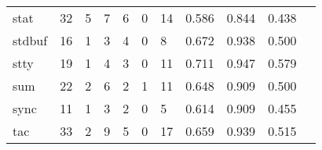 \begin{longtable}{lp{1.20cm}p{1.20cm}p{1.20cm}p{1.20cm}p{1.20cm}p{1.20cm}p{1.20cm}p{1.20cm}p{1.20cm}p{1.20cm}}
stat      &                                    32 &                                                  5 &                                                  7 &                                                  6 &                                                  0 &                                                 14 &                                         0.586 &                                              0.844 &                                              0.438 \\
stdbuf    &                                    16 &                                                  1 &                                                  3 &                                                  4 &                                                  0 &                                                  8 &                                         0.672 &                                              0.938 &                                              0.500 \\
stty      &                                    19 &                                                  1 &                                                  4 &                                                  3 &                                                  0 &                                                 11 &                                         0.711 &                                              0.947 &                                              0.579 \\
sum       &                                    22 &                                                  2 &                                                  6 &                                                  2 &                                                  1 &                                                 11 &                                         0.648 &                                              0.909 &                                              0.500 \\
sync      &                                    11 &                                                  1 &                                                  3 &                                                  2 &                                                  0 &                                                  5 &                                         0.614 &                                              0.909 &                                              0.455 \\
tac       &                                    33 &                                                  2 &                                                  9 &                                                  5 &                                                  0 &                                                 17 &                                         0.659 &                                              0.939 &                                              0.515 \\

\end{longtable}
